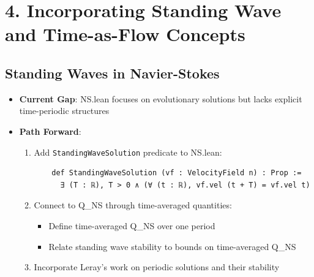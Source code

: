 \documentclass[11pt]{article}
\begin{document}
\section{4. Incorporating Standing Wave and Time-as-Flow Concepts}

\subsection{Standing Waves in Navier-Stokes}
\begin{itemize}
\item \textbf{Current Gap}: NS.lean focuses on evolutionary solutions but lacks explicit time-periodic structures
\item \textbf{Path Forward}:
  \begin{enumerate}
  \item Add \texttt{StandingWaveSolution} predicate to NS.lean:
    \begin{verbatim}
    def StandingWaveSolution (vf : VelocityField n) : Prop :=
      ∃ (T : ℝ), T > 0 ∧ (∀ (t : ℝ), vf.vel (t + T) = vf.vel t)
    \end{verbatim}
  \item Connect to Q\_NS through time-averaged quantities:
    \begin{itemize}
    \item Define time-averaged Q\_NS over one period
    \item Relate standing wave stability to bounds on time-averaged Q\_NS
    \end{itemize}
  \item Incorporate Leray's work on periodic solutions and their stability
  \end{enumerate}
\end{itemize}
\end{document}
